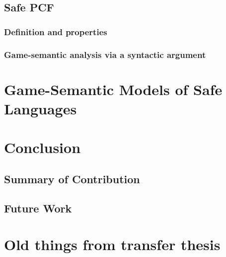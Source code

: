     \section{Safe PCF}
        \subsection{Definition and properties}
        \subsection{Game-semantic analysis via a syntactic argument}

    


\chapter{Game-Semantic Models of Safe Languages}

    



\chapter{Conclusion}
    \section{Summary of Contribution}
    \section{Future Work}


\chapter{Old things from transfer thesis}













    
    

         {\protect{}}


